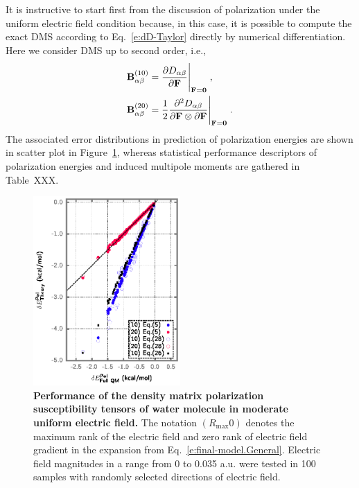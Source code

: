 \documentclass[aip,amsmath,amssymb,reprint,floatfix]{revtex4-1}
\begin{document}
It is instructive to start first from the discussion of polarization under the uniform electric field
condition because, in this case, it is possible to compute the exact DMS according to Eq.~\eqref{e:dD-Taylor} 
directly by numerical differentiation. Here we consider DMS up to second order, i.e.,
%
\begin{subequations}\label{e:exact-DMS}
 \begin{align}
  {\bf B}^{(10)}_{\alpha\beta} &= \frac{\partial D_{\alpha\beta}}{\partial {\bf F}}\Bigg|_{{\bf F}={\bf 0}} \;, \label{e:B10} \\
  {\bf B}^{(20)}_{\alpha\beta} &= \frac{1}{2} 
     \frac{\partial^2 D_{\alpha\beta}}{\partial {\bf F} \otimes \partial {\bf F}}\Bigg|_{{\bf F}={\bf 0}} \;. \label{e:B20}
 \end{align}
\end{subequations}
%
The associated error distributions in prediction of polarization energies 
are shown in scatter plot in Figure~\ref{f:fig-1}, whereas
statistical performance descriptors of polarization energies and induced multipole moments
are gathered in Table~XXX.
\begin{figure}[h]
\includegraphics[width=0.5\textwidth]{data/dmatpol/water/figure1/fig-1.eps}
\caption{\label{f:fig-1} {\bf Performance of the density matrix polarization susceptibility tensors of water molecule
in moderate uniform electric field.} The notation $(R_{\max}0)$ denotes the maximum rank of the electric field
and zero rank of electric field gradient in the expansion from Eq.~\eqref{e:final-model.General}.
Electric field magnitudes in a range from 0 to 0.035 a.u. were tested in 100 samples with randomly selected 
directions of electric field.
} 
\end{figure}
\end{document}
